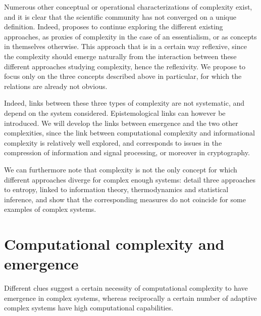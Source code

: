 Numerous other conceptual or operational characterizations of complexity exist, and it is clear that the scientific community has not converged on a unique definition. Indeed, \cite{chu2008criteria} proposes to continue exploring the different existing approaches, as proxies of complexity in the case of an essentialism, or as concepts in themselves otherwise. This approach that is in a certain way reflexive, since the complexity should emerge naturally from the interaction between these different approaches studying complexity, hence the reflexivity. We propose to focus only on the three concepts described above in particular, for which the relations are already not obvious.



Indeed, links between these three types of complexity are not systematic, and depend on the system considered. Epistemological links can however be introduced. We will develop the links between emergence and the two other complexities, since the link between computational complexity and informational complexity is relatively well explored, and corresponds to issues in the compression of information and signal processing, or moreover in cryptography.


We can furthermore note that complexity is not the only concept for which different approaches diverge for complex enough systems: \cite{thurner2017three} detail three approaches to entropy, linked to information theory, thermodynamics and statistical inference, and show that the corresponding measures do not coincide for some examples of complex systems.



\section{Computational complexity and emergence}

Different clues suggest a certain necessity of computational complexity to have emergence in complex systems, whereas reciprocally a certain number of adaptive complex systems have high computational capabilities.


